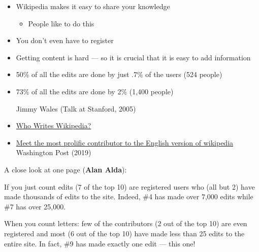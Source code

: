 \documentclass[a4paper,landscape,headrule,footrule,xetex]{foils}
\begin{document}

\begin{itemize}
\item Wikipedia makes it easy to share your knowledge
  \begin{itemize}
    \item People like to do this
  \end{itemize}
\item You don't even have to register
\item Getting content is hard --- so it is crucial that it is easy to add information
\end{itemize}


\begin{itemize}
\item 50\% of all the edits are done by just .7\% of the users (524 people)
\item 73\% of all the edits are done by 2\%  (1,400 people)
  \begin{flushright}
    Jimmy Wales (Talk at Stanford, 2005)
  \end{flushright}
\end{itemize}


\begin{itemize}
\item
  \href{https://en.wikipedia.org/wiki/Wikipedia:Who_writes_Wikipedia?}{Who
  Writes Wikipedia?}
\item 
\href{https://www.washingtonpost.com/lifestyle/magazine/meet-the-most-prolific-contributor-to-the-english-version-of-wikipedia/2018/10/02/a6497a74-9411-11e8-a679-b09212fb69c2_story.html?utm_term=.18bfc6ecda09}{Meet
  the most prolific contributor to the English version of wikipedia}
Washington Post (2019)
\end{itemize}



A close look at one page (\textbf{Alan Alda}):

If you just count edits (7 of the top 10) are registered users who
(all but 2) have made thousands of edits to the site. Indeed, \#4 has
made over 7,000 edits while \#7 has over 25,000.

When you count letters: few of the contributors (2 out of the top 10)
are even registered and most (6 out of the top 10) have made less than
25 edits to the entire site. In fact, \#9 has made exactly one edit —
this one!
\end{document}
